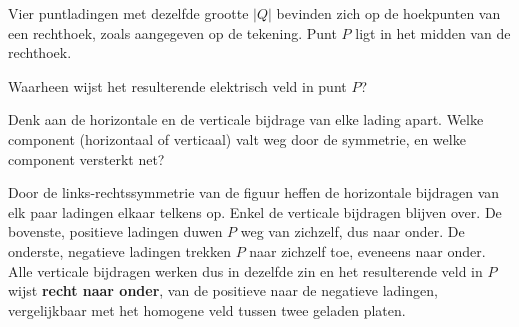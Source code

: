\documentclass{ximera}
\begin{document}
\begin{question}
    Vier puntladingen met dezelfde grootte $|Q|$ bevinden zich op de hoekpunten van een rechthoek, zoals aangegeven op de tekening. Punt $P$ ligt in het midden van de rechthoek.

    \begin{center}
    \end{center}

    Waarheen wijst het resulterende elektrisch veld in punt $P$?

    \begin{multipleChoice}
    \end{multipleChoice}

    \begin{hint}
        Denk aan de horizontale en de verticale bijdrage van elke lading apart. Welke component (horizontaal of verticaal) valt weg door de symmetrie, en welke component versterkt net?
    \end{hint}

    \begin{solution}\nl
        Door de links-rechtssymmetrie van de figuur heffen de horizontale bijdragen van elk paar ladingen elkaar telkens op. Enkel de verticale bijdragen blijven over. De bovenste, positieve ladingen duwen $P$ weg van zichzelf, dus naar onder. De onderste, negatieve ladingen trekken $P$ naar zichzelf toe, eveneens naar onder. Alle verticale bijdragen werken dus in dezelfde zin en het resulterende veld in $P$ wijst \textbf{recht naar onder}, van de positieve naar de negatieve ladingen, vergelijkbaar met het homogene veld tussen twee geladen platen.
    \end{solution}
\end{question}
\end{document}
